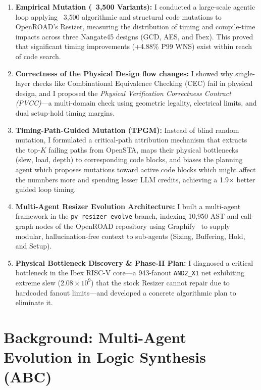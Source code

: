 \documentclass[10pt, conference]{IEEEtran}
\begin{document}
\begin{enumerate}
  \item \textbf{ Empirical Mutation (~3{,}500 Variants):} I conducted a large-scale agentic loop applying ~3{,}500 algorithmic and structural code mutations to OpenROAD's Resizer, measuring the distribution of timing and compile-time impacts across three Nangate45 designs (GCD, AES, and Ibex). This proved that significant timing improvements (+4.88\% P99 WNS) exist within reach of code search.
  \item \textbf{Correctness of the Physical Design flow changes:} I showed why single-layer checks like Combinational Equivalence Checking (CEC) fail in physical design, and I proposed the \emph{Physical Verification Correctness Contract (PVCC)}---a multi-domain check using geometric legality, electrical limits, and dual setup-hold timing margins.
  \item \textbf{Timing-Path-Guided Mutation (TPGM):} Instead of blind random mutation, I formulated a critical-path attribution mechanism that extracts the top-$K$ failing paths from OpenSTA, maps their physical bottlenecks (slew, load, depth) to corresponding code blocks, and biases the planning agent which proposes mutations toward active code blocks which might affect the numnbers more and spending lesser LLM credits, achieving a 1.9$\times$ better guided loop timing.
  \item \textbf{Multi-Agent Resizer Evolution Architecture:} I built a multi-agent framework in the \texttt{pv\_resizer\_evolve} branch, indexing 10{,}950 AST and call-graph nodes of the OpenROAD repository using Graphify~\cite{graphify} to supply modular, hallucination-free context to sub-agents (Sizing, Buffering, Hold, and Setup).
  \item \textbf{Physical Bottleneck Discovery \& Phase-II Plan:} I diagnosed a critical bottleneck in the Ibex RISC-V core---a 943-fanout \texttt{AND2\_X1} net exhibiting extreme slew ($2.08 \times 10^9$) that the stock Resizer cannot repair due to hardcoded fanout limits---and developed a concrete algorithmic plan to eliminate it.
\end{enumerate}

\section{Background: Multi-Agent Evolution in Logic Synthesis (ABC)}
\label{sec:abc_background}
\end{document}

